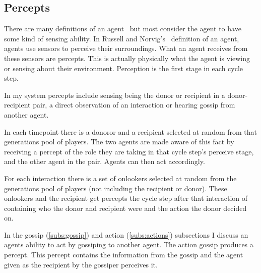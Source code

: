 \documentclass[]{final_report}
\begin{document}
\subsection{Percepts}
\label{subs:percepts}
There are many definitions of an agent~\cite{franklin1996agent} but most consider the agent to have some kind of sensing ability. In Russell and Norvig's~\cite{russell2016artificial} definition of an agent, agents use sensors to perceive their surroundings. What an agent receives from these sensors are percepts. This is actually physically what the agent is viewing or sensing about their environment. Perception is the first stage in each cycle step.\par
In my system percepts include sensing being the donor or recipient in a donor-recipient pair, a direct observation of an interaction or hearing gossip from another agent.\par
In each timepoint there is a donoror and a recipient selected at random from that generations pool of players. The two agents are made aware of this fact by receiving a percept of the role they are taking in that cycle step's perceive stage, and the other agent in the pair. Agents can then act accordingly.\par
For each interaction there is a set of onlookers selected at random from the generations pool of players (not including the recipient or donor). These onlookers and the recipient get percepts the cycle step after that interaction of containing who the donor and recipient were and the action the donor decided on.\par
In the gossip (\ref{subs:gossip}) and action (\ref{subs:actions}) subsections I discuss an agents ability to act by gossiping to another agent. The action gossip produces a percept. This percept contains the information from the gossip and the agent given as the recipient by the gossiper perceives it.
\end{document}
